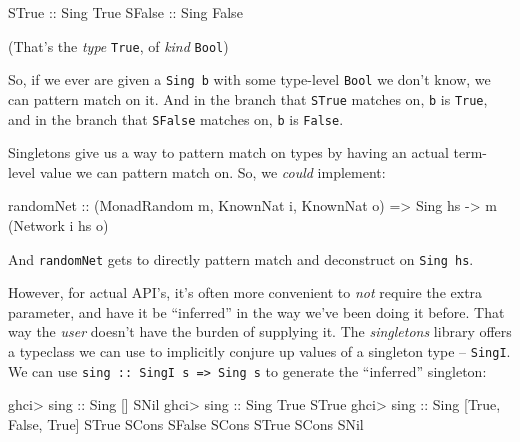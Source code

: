 \documentclass[]{article}
\newenvironment{Shaded}{}{}
\newcommand{\CharTok}[1]{\textcolor[rgb]{0.25,0.44,0.63}{#1}}
\newcommand{\DataTypeTok}[1]{\textcolor[rgb]{0.56,0.13,0.00}{#1}}
\newcommand{\NormalTok}[1]{#1}
\newcommand{\OperatorTok}[1]{\textcolor[rgb]{0.40,0.40,0.40}{#1}}
\newcommand{\OtherTok}[1]{\textcolor[rgb]{0.00,0.44,0.13}{#1}}
\begin{document}
\begin{Shaded}
\begin{Highlighting}[]
\DataTypeTok{STrue}\OtherTok{  ::} \DataTypeTok{Sing} \DataTypeTok{\textquotesingle{}True}
\DataTypeTok{SFalse}\OtherTok{ ::} \DataTypeTok{Sing} \DataTypeTok{\textquotesingle{}False}
\end{Highlighting}
\end{Shaded}

(That's the \emph{type} \texttt{\textquotesingle{}True}, of \emph{kind}
\texttt{Bool})

So, if we ever are given a \texttt{Sing\ b} with some type-level \texttt{Bool}
we don't know, we can pattern match on it. And in the branch that \texttt{STrue}
matches on, \texttt{b} is \texttt{\textquotesingle{}True}, and in the branch
that \texttt{SFalse} matches on, \texttt{b} is \texttt{False}.

Singletons give us a way to pattern match on types by having an actual
term-level value we can pattern match on. So, we \emph{could} implement:

\begin{Shaded}
\begin{Highlighting}[]
\OtherTok{randomNet ::}\NormalTok{ (}\DataTypeTok{MonadRandom}\NormalTok{ m, }\DataTypeTok{KnownNat}\NormalTok{ i, }\DataTypeTok{KnownNat}\NormalTok{ o)}
          \OtherTok{=>} \DataTypeTok{Sing}\NormalTok{ hs }\OtherTok{{-}>}\NormalTok{ m (}\DataTypeTok{Network}\NormalTok{ i hs o)}
\end{Highlighting}
\end{Shaded}

And \texttt{randomNet} gets to directly pattern match and deconstruct on
\texttt{Sing\ hs}.

However, for actual API's, it's often more convenient to \emph{not} require the
extra parameter, and have it be ``inferred'' in the way we've been doing it
before. That way the \emph{user} doesn't have the burden of supplying it. The
\emph{singletons} library offers a typeclass we can use to implicitly conjure up
values of a singleton type -- \texttt{SingI}. We can use
\texttt{sing\ ::\ SingI\ s\ =\textgreater{}\ Sing\ s} to generate the
``inferred'' singleton:

\begin{Shaded}
\begin{Highlighting}[]
\NormalTok{ghci}\OperatorTok{>}\OtherTok{ sing ::} \DataTypeTok{Sing}\NormalTok{ \textquotesingle{}[]}
\DataTypeTok{SNil}
\NormalTok{ghci}\OperatorTok{>}\OtherTok{ sing ::} \DataTypeTok{Sing} \DataTypeTok{\textquotesingle{}True}
\DataTypeTok{STrue}
\NormalTok{ghci}\OperatorTok{>}\OtherTok{ sing ::} \DataTypeTok{Sing} \CharTok{\textquotesingle{}[\textquotesingle{}}\DataTypeTok{True}\NormalTok{, }\DataTypeTok{\textquotesingle{}False}\NormalTok{, }\DataTypeTok{\textquotesingle{}True}\NormalTok{]}
\DataTypeTok{STrue} \OtherTok{\textasciigrave{}SCons\textasciigrave{}} \DataTypeTok{SFalse} \OtherTok{\textasciigrave{}SCons\textasciigrave{}} \DataTypeTok{STrue} \OtherTok{\textasciigrave{}SCons\textasciigrave{}} \DataTypeTok{SNil}
\end{Highlighting}
\end{Shaded}
\end{document}
